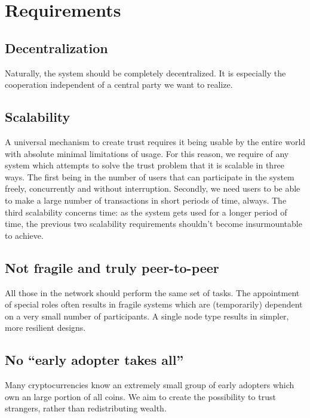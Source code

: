 \chapter{Requirements}
\section{Decentralization}
Naturally, the system should be completely decentralized. It is especially the cooperation independent of a central party we want to realize.

\section{Scalability}
A universal mechanism to create trust requires it being usable by the entire world with absolute minimal limitations of usage. For this reason, we require of any system which attempts to solve the trust problem that it is scalable in three ways. The first being in the number of users that can participate in the system freely, concurrently and without interruption. Secondly, we need users to be able to make a large number of transactions in short periods of time, always. The third scalability concerns time: as the system gets used for a longer period of time, the previous two scalability requirements shouldn't become insurmountable to achieve.

\section{Not fragile and truly peer-to-peer}
All those in the network should perform the same set of tasks. The appointment of special roles often results in fragile systems which are (temporarily) dependent on a very small number of participants. A single node type results in simpler, more resilient designs.

\section{No ``early adopter takes all''}
Many cryptocurrencies know an extremely small group of early adopters which own an large portion of all coins. We aim to create the possibility to trust strangers, rather than redistributing wealth.
